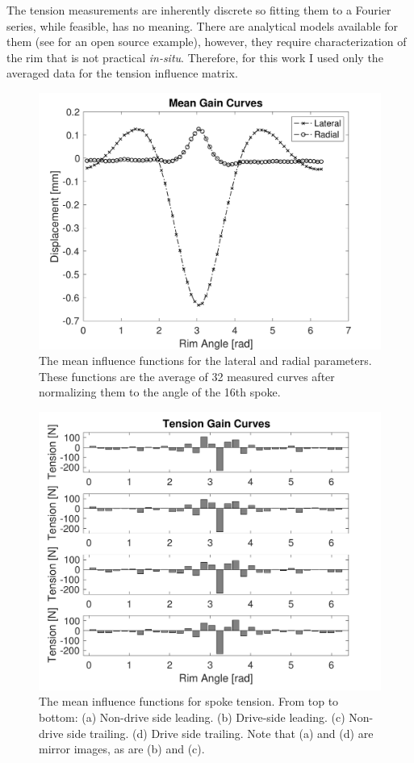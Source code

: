 \documentclass[journal]{IEEEtran}
\begin{document}
The tension measurements are inherently discrete so fitting them to a Fourier series, while feasible, has no meaning. There are analytical models available for them (see \cite{ModeMatrix} for an open source example), however, they require characterization of the rim that is not practical \emph{in-situ}.  Therefore, for this work I used only the averaged data for the tension influence matrix.  

\begin{figure}[!t]
\centering
\includegraphics[width=3.25 in]{./figs/gc_lat_rad}
\caption{The mean influence functions for the lateral and radial parameters.  These functions are the average of 32 measured curves after normalizing them to the angle of the 16th spoke.}
\label{fig:gclr}
\end{figure}

\begin{figure}[!t]
\centering
\includegraphics[width=3.25 in]{./figs/gc_ten}
\caption{The mean influence functions for spoke tension. From top to bottom: (a) Non-drive side leading. (b) Drive-side leading. (c) Non-drive side trailing. (d) Drive side trailing.  Note that (a) and (d) are mirror images, as are (b) and (c).}
\label{fig:gc_ten}
\end{figure}
\end{document}
